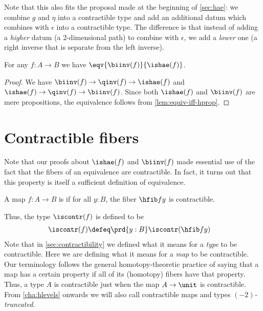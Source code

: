 Note that this also fits the proposal made at the beginning of \cref{sec:hae}: we combine $g$ and $\eta$ into a contractible type and add an additional datum which combines with $\epsilon$ into a contractible type.
The difference is that instead of adding a \emph{higher} datum (a 2-dimensional path) to combine with $\epsilon$, we add a \emph{lower} one (a right inverse that is separate from the left inverse).

\begin{cor}\label{thm:equiv-biinv-isequiv}
  For any $f:A\to B$ we have $\eqv{\biinv(f)}{\ishae(f)}$.
\end{cor}
\begin{proof}
  We have $\biinv(f) \to \qinv(f) \to \ishae(f)$ and $\ishae(f) \to \qinv(f) \to \biinv(f)$.
  Since both $\ishae(f)$ and $\biinv(f)$ are mere propositions, the equivalence follows from \cref{lem:equiv-iff-hprop}.
\end{proof}

%
%
%

\section{Contractible fibers}
\label{sec:contrf}

%
%
%

Note that our proofs about $\ishae(f)$ and $\biinv(f)$ made essential use of the fact that the fibers of an equivalence are contractible.
In fact, it turns out that this property is itself a sufficient definition of equivalence.

\begin{defn} \label{defn:equivalence}
  A map $f:A\to B$ is 
  if for all $y:B$, the fiber $\hfib f y$ is contractible.
\end{defn}

Thus, the type $\iscontr(f)$ is defined to be
\begin{align}
  \iscontr(f) &\defeq \prd{y:B} \iscontr(\hfib f y)\label{eq:iscontrf}
\end{align}
Note that in \cref{sec:contractibility} we defined what it means for a \emph{type} to be contractible.
Here we are defining what it means for a \emph{map} to be contractible.
Our terminology follows the general homotopy-theoretic practice of saying that a map has a certain property if all of its (homotopy) fibers have that property.
Thus, a type $A$ is contractible just when the map $A\to\unit$ is contractible.
From \cref{cha:hlevels} onwards we will also call contractible maps and types \emph{$(-2)$-truncated}.

